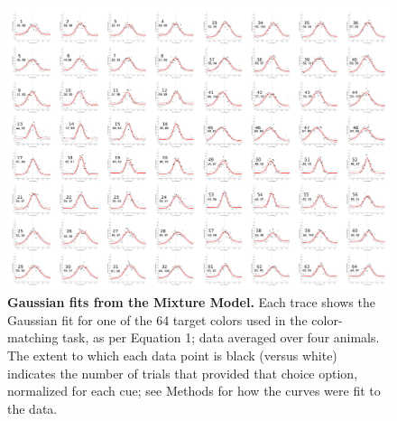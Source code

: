\begin{figure}
    \centering
    \begin{fullwidth}
    \includegraphics[width=\textwidth+4cm]{../Figures/flat/SI3_MMBreakOut_2.jpg}
    \caption{\textbf{Gaussian fits from the Mixture Model.}
    Each trace shows the Gaussian fit for one of the 64 target colors used in the color-matching task, as per Equation 1; data averaged over four animals. The extent to which each data point is black (versus white) indicates the number of trials that provided that choice option, normalized for each cue; see Methods for how the curves were fit to the data. 
    } 
    \label{fig:MMBreakOut}
    \end{fullwidth}
\end{figure}

